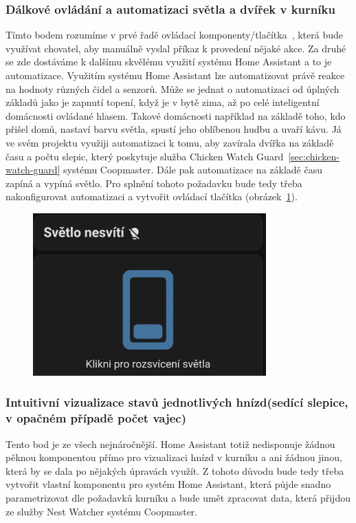 \subsubsection*{Dálkové ovládání a automatizaci světla a dvířek v kurníku}
Tímto bodem rozumíme v prvé řadě ovládací komponenty/tlačítka~\cite{HomeAssistantButtonCard}, která bude využívat chovatel, aby manuálně vyslal příkaz k provedení nějaké akce.
Za druhé se zde dostáváme k dalšímu skvělému využití systému Home Assistant a to je automatizace.
Využitím systému Home Assistant lze automatizovat právě reakce na hodnoty různých čidel a senzorů.
Může se jednat o automatizaci od úplných základů jako je zapnutí topení, když je v bytě zima, až po celé inteligentní domácnosti ovládané hlasem.
Takové domácnosti například na základě toho, kdo přišel domů, nastaví barvu světla, spustí jeho oblíbenou hudbu a uvaří kávu.
Já ve svém projektu využiji automatizaci k tomu, aby zavírala dvířka na základě času a počtu slepic, který poskytuje služba Chicken Watch Guard~\ref{sec:chicken-watch-guard} systému Coopmaster.
Dále pak automatizace na základě času zapíná a vypíná světlo.\newline
Pro splnění tohoto požadavku bude tedy třeba nakonfigurovat automatizaci a vytvořit ovládací tlačítka (obrázek~\ref{fig:homeassitant_lamp_button}).

\begin{figure}[H]
    \centering
    \includegraphics[width=0.8\textwidth]{img/homeasistant_lamp_button}
    \label{fig:homeassitant_lamp_button}
\end{figure}

\subsubsection*{Intuitivní vizualizace stavů jednotlivých hnízd(sedící slepice, v opačném případě počet vajec)}
Tento bod je ze všech nejnáročnější.
Home Assistant totiž nedisponuje žádnou pěknou komponentou přímo pro vizualizaci hnízd v kurníku a ani žádnou jinou, která by se dala po nějakých úpravách využít.\newline
Z tohoto důvodu bude tedy třeba vytvořit vlastní komponentu pro systém Home Assistant, která půjde snadno parametrizovat dle požadavků kurníku a bude umět zpracovat data, která přijdou ze služby Nest Watcher systému Coopmaster.

